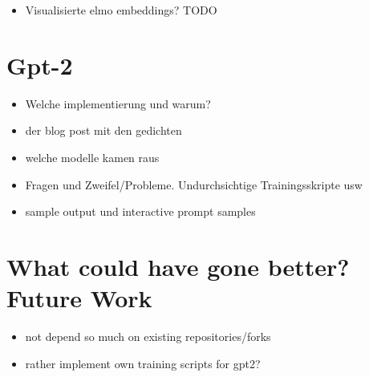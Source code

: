 \documentclass[sigconf,natbib=false]{acmart}
\begin{document}
\begin{itemize}
	\item Visualisierte elmo embeddings? TODO
\end{itemize}

\section{Gpt-2}

\begin{itemize}
	\item Welche implementierung und warum?
	\item der blog post mit den gedichten
	\item welche modelle kamen raus
	\item Fragen und Zweifel/Probleme. Undurchsichtige Trainingsskripte usw
	\item sample output und interactive prompt samples
\end{itemize}



\section{What could have gone better? Future Work}

\begin{itemize}
	\item not depend so much on existing repositories/forks 
	\item rather implement own training scripts for gpt2?
	
\end{itemize}


 
%
%
%

\printbibliography
\end{document}

